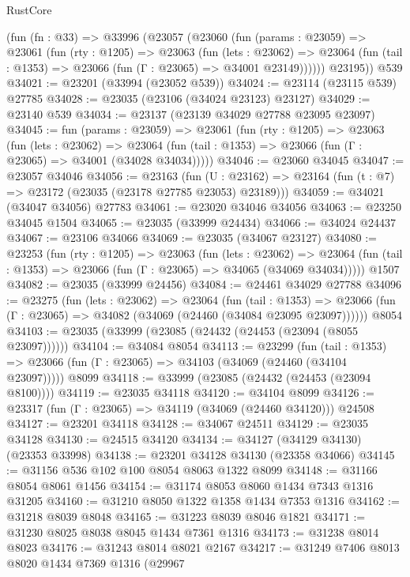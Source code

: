 \begin{lexlean}{RustCore}
\begin{coremodule}
    (fun (fn : @33) =>
    @33996
      (@23057
        (@23060
          (fun (params : @23059) =>
          @23061
            (fun (rty : @1205) =>
            @23063
              (fun (lets : @23062) =>
              @23064 (fun (tail : @1353) => @23066 (fun (Γ : @23065) => @34001 @23149))))))
        @23195))
    @539
@34021 := @23201 (@33994 (@23052 @539))
@34024 := @23114 (@23115 @539) @27785
@34028 := @23035 (@23106 (@34024 @23123) @23127)
@34029 := @23140 @539
@34034 := @23137 (@23139 @34029 @27788 @23095 @23097)
@34045 := fun (params : @23059) =>
  @23061
    (fun (rty : @1205) =>
    @23063
      (fun (lets : @23062) =>
      @23064 (fun (tail : @1353) => @23066 (fun (Γ : @23065) => @34001 (@34028 @34034)))))
@34046 := @23060 @34045
@34047 := @23057 @34046
@34056 := @23163
    (fun (U : @23162) => @23164 (fun (t : @7) => @23172 (@23035 (@23178 @27785 @23053) @23189)))
@34059 := @34021 (@34047 @34056) @27783
@34061 := @23020 @34046 @34056
@34063 := @23250 @34045 @1504
@34065 := @23035 (@33999 @24434)
@34066 := @34024 @24437
@34067 := @23106 @34066
@34069 := @23035 (@34067 @23127)
@34080 := @23253
    (fun (rty : @1205) =>
    @23063
      (fun (lets : @23062) =>
      @23064 (fun (tail : @1353) => @23066 (fun (Γ : @23065) => @34065 (@34069 @34034)))))
    @1507
@34082 := @23035 (@33999 @24456)
@34084 := @24461 @34029 @27788
@34096 := @23275
    (fun (lets : @23062) =>
    @23064
      (fun (tail : @1353) =>
      @23066 (fun (Γ : @23065) => @34082 (@34069 (@24460 (@34084 @23095 @23097))))))
    @8054
@34103 := @23035 (@33999 (@23085 (@24432 (@24453 (@23094 (@8055 @23097))))))
@34104 := @34084 @8054
@34113 := @23299
    (fun (tail : @1353) => @23066 (fun (Γ : @23065) => @34103 (@34069 (@24460 (@34104 @23097)))))
    @8099
@34118 := @33999 (@23085 (@24432 (@24453 (@23094 @8100))))
@34119 := @23035 @34118
@34120 := @34104 @8099
@34126 := @23317 (fun (Γ : @23065) => @34119 (@34069 (@24460 @34120))) @24508
@34127 := @23201 @34118
@34128 := @34067 @24511
@34129 := @23035 @34128
@34130 := @24515 @34120
@34134 := @34127 (@34129 @34130) (@23353 @33998)
@34138 := @23201 @34128 @34130 (@23358 @34066)
@34145 := @31156 @536 @102 @100 @8054 @8063 @1322 @8099
@34148 := @31166 @8054 @8061 @1456
@34154 := @31174 @8053 @8060 @1434 @7343 @1316 @31205
@34160 := @31210 @8050 @1322 @1358 @1434 @7353 @1316
@34162 := @31218 @8039 @8048
@34165 := @31223 @8039 @8046 @1821
@34171 := @31230 @8025 @8038 @8045 @1434 @7361 @1316
@34173 := @31238 @8014 @8023
@34176 := @31243 @8014 @8021 @2167
@34217 := @31249
    @7406
    @8013
    @8020
    @1434
    @7369
    @1316
    (@29967

\end{coremodule}
\end{lexlean}
